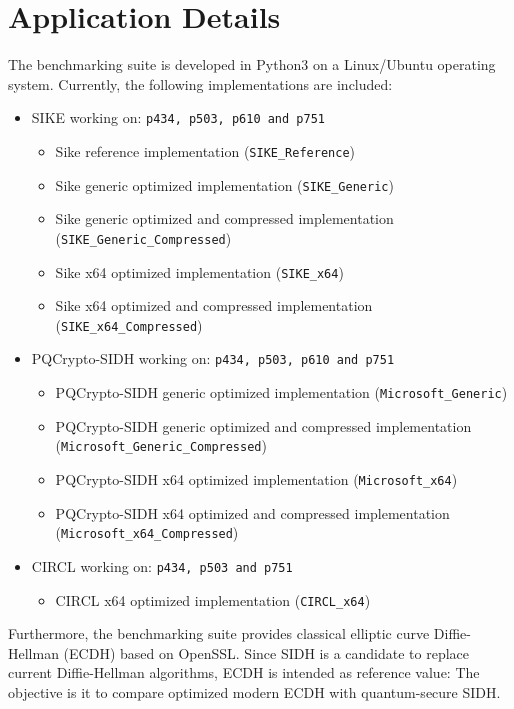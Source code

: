 \section{Application Details}\label{sec:benchmarks_details}
The benchmarking suite is developed in Python3 on a Linux/Ubuntu operating system. Currently, the following implementations are included:
\label{sec:included_implementations}
\begin{itemize}
\item SIKE working on: \texttt{p434, p503, p610 and p751}
	\begin{itemize}
	\item Sike reference implementation (\texttt{SIKE\_Reference})
	\item Sike generic optimized implementation (\texttt{SIKE\_Generic})
	\item Sike generic optimized and compressed implementation (\texttt{SIKE\_Generic\_Compressed})
	\item Sike x64 optimized implementation (\texttt{SIKE\_x64})
	\item Sike x64 optimized and compressed implementation (\texttt{SIKE\_x64\_Compressed})
	\end{itemize}
\item PQCrypto-SIDH working on: \texttt{p434, p503, p610 and p751}
	\begin{itemize}
	\item PQCrypto-SIDH generic optimized implementation (\texttt{Microsoft\_Generic})
	\item PQCrypto-SIDH generic optimized and compressed implementation \\ (\texttt{Microsoft\_Generic\_Compressed})
	\item PQCrypto-SIDH x64 optimized implementation (\texttt{Microsoft\_x64})
	\item PQCrypto-SIDH x64 optimized and compressed implementation \\ (\texttt{Microsoft\_x64\_Compressed})
	\end{itemize}
\item CIRCL working on: \texttt{p434, p503 and p751}
	\begin{itemize}
	\item CIRCL x64 optimized implementation (\texttt{CIRCL\_x64})
	\end{itemize}
\end{itemize}
Furthermore, the benchmarking suite provides classical elliptic curve Diffie-Hellman (ECDH) based on OpenSSL. Since SIDH is a candidate to replace current Diffie-Hellman algorithms, ECDH is intended as reference value: The objective is it to compare optimized modern ECDH with quantum-secure SIDH.\\
